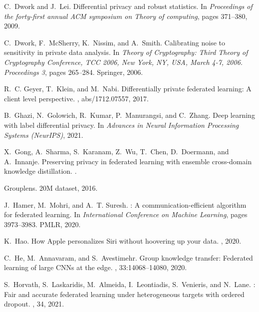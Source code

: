 \documentclass{article}
\begin{document}
\begin{thebibliography}{10}
C.~Dwork and J.~Lei.
\newblock Differential privacy and robust statistics.
\newblock In {\em Proceedings of the forty-first annual ACM symposium on Theory
  of computing}, pages 371--380, 2009.

C.~Dwork, F.~McSherry, K.~Nissim, and A.~Smith.
\newblock Calibrating noise to sensitivity in private data analysis.
\newblock In {\em Theory of Cryptography: Third Theory of Cryptography
  Conference, TCC 2006, New York, NY, USA, March 4-7, 2006. Proceedings 3},
  pages 265--284. Springer, 2006.

R.~C. Geyer, T.~Klein, and M.~Nabi.
\newblock Differentially private federated learning: {A} client level
  perspective.
, abs/1712.07557, 2017.

B.~Ghazi, N.~Golowich, R.~Kumar, P.~Manurangsi, and C.~Zhang.
\newblock Deep learning with label differential privacy.
\newblock In {\em Advances in Neural Information Processing Systems (NeurIPS)},
  2021.

X.~Gong, A.~Sharma, S.~Karanam, Z.~Wu, T.~Chen, D.~Doermann, and A.~Innanje.
\newblock Preserving privacy in federated learning with ensemble cross-domain
  knowledge distillation.
.

Grouplens.
 {20M} dataset, 2016.

J.~Hamer, M.~Mohri, and A.~T. Suresh.
: A communication-efficient algorithm for federated
  learning.
\newblock In {\em International Conference on Machine Learning}, pages
  3973--3983. PMLR, 2020.

K.~Hao.
\newblock How {A}pple personalizes {S}iri without hoovering up your data.
, 2020.

C.~He, M.~Annavaram, and S.~Avestimehr.
\newblock Group knowledge transfer: Federated learning of large {CNNs} at the
  edge.
,
  33:14068--14080, 2020.

S.~Horvath, S.~Laskaridis, M.~Almeida, I.~Leontiadis, S.~Venieris, and N.~Lane.
: Fair and accurate federated learning under heterogeneous
  targets with ordered dropout.
, 34, 2021.


\end{thebibliography}
\end{document}
